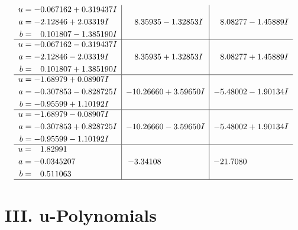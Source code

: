\documentclass[1p]{elsarticle_modified}
\theoremstyle{definition}
\begin{document}
$$\begin{array}{c|c|c}
\begin{aligned}
u &= -0.067162 + 0.319437 I \\
a &= -2.12846 + 2.03319 I \\
b &= \phantom{-}0.101807 - 1.385190 I\end{aligned}
 & \phantom{-}8.35935 - 1.32853 I & \phantom{-}8.08277 - 1.45889 I \\ \hline\begin{aligned}
u &= -0.067162 - 0.319437 I \\
a &= -2.12846 - 2.03319 I \\
b &= \phantom{-}0.101807 + 1.385190 I\end{aligned}
 & \phantom{-}8.35935 + 1.32853 I & \phantom{-}8.08277 + 1.45889 I \\ \hline\begin{aligned}
u &= -1.68979 + 0.08907 I \\
a &= -0.307853 - 0.828725 I \\
b &= -0.95599 + 1.10192 I\end{aligned}
 & -10.26660 + 3.59650 I & -5.48002 - 1.90134 I \\ \hline\begin{aligned}
u &= -1.68979 - 0.08907 I \\
a &= -0.307853 + 0.828725 I \\
b &= -0.95599 - 1.10192 I\end{aligned}
 & -10.26660 - 3.59650 I & -5.48002 + 1.90134 I \\ \hline\begin{aligned}
u &= \phantom{-}1.82991\phantom{ +0.000000I} \\
a &= -0.0345207\phantom{ +0.000000I} \\
b &= \phantom{-}0.511063\phantom{ +0.000000I}\end{aligned}
 & -3.34108\phantom{ +0.000000I} & -21.7080\phantom{ +0.000000I}\\
 \hline 
 \end{array}$$\newpage
\newpage\renewcommand{\arraystretch}{1}
\centering \section*{ III. u-Polynomials}
\end{document}
